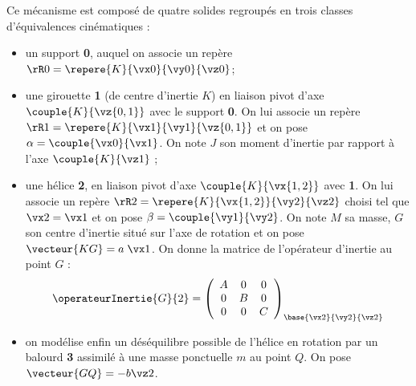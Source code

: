 \documentclass[11pt]{article}
\begin{document}
Ce mécanisme est composé de quatre solides regroupés en  trois classes d'équivalences cinématiques :

\begin{itemize}
\item un support \textbf{0}, auquel on associe un repère $\rR0=\repere{K}{\vx0}{\vy0}{\vz0}$;
\item une girouette \textbf{1} (de centre d'inertie $K$) en liaison pivot d'axe $\couple{K}{\vz{0,1}}$ avec le support \textbf{0}. On lui associe un repère $\rR1=\repere{K}{\vx1}{\vy1}{\vz{0,1}}$ et on pose $\alpha=\couple{\vx0}{\vx1}$. On note $J$ son moment d'inertie par rapport à l'axe $\couple{K}{\vz1}$ ; %
\item une hélice \textbf{2}, en liaison pivot d'axe $\couple{K}{\vx{1,2}}$  avec \textbf{1}. On lui associe un repère $\rR2=\repere{K}{\vx{1,2}}{\vy2}{\vz2}$  choisi tel que $\vx2=\vx1$ et on pose $\beta=\couple{\vy1}{\vy2}$.
On note $M$ sa masse, $G$ son centre d'inertie situé sur l'axe de rotation et on pose $\vecteur{KG}=a\;\vx1$. On donne la matrice de l'opérateur d'inertie au point $G$ :
\begin{align*}
\operateurInertie{G}{2}=
\left(
\begin{array}{ccc}
A & 0 & 0 \\ 
0 & B & 0 \\ 
0 & 0 & C
\end{array}
\right)_{\base{\vx2}{\vy2}{\vz2}}
\end{align*}
\item on modélise enfin un déséquilibre possible de l'hélice en rotation par un balourd \textbf{3} assimilé à une masse ponctuelle $m$ au point $Q$. On pose $\vecteur{GQ}=-b\vz2$.
\end{itemize}
\end{document}

